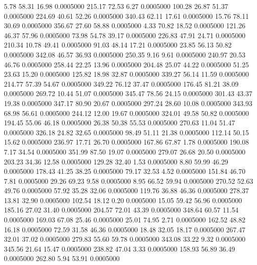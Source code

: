    5.78   58.31   16.98   0.0005000
 215.17   72.53    6.27   0.0005000
 100.28   26.87   51.37   0.0005000
 224.69   40.61   52.26   0.0005000
 340.43   62.11   17.61   0.0005000
  15.76   78.11   30.69   0.0005000
 356.67   27.60   58.88   0.0005000
   4.33   70.82   18.52   0.0005000
 121.26   46.37   57.96   0.0005000
  73.98   54.78   39.17   0.0005000
 226.83   47.91   24.71   0.0005000
 210.34   10.78   49.41   0.0005000
  91.03   48.14   17.21   0.0005000
  23.85   56.13   50.82   0.0005000
 342.08   46.57   36.93   0.0005000
 250.35    9.16    9.61   0.0005000
 240.97   20.53   46.76   0.0005000
 258.44   22.25   13.96   0.0005000
 204.48   25.07   44.22   0.0005000
  51.25   23.63   15.20   0.0005000
 125.82   18.98   32.87   0.0005000
 339.27   56.14   11.59   0.0005000
 214.77   57.39   54.67   0.0005000
 349.22   76.12   37.47   0.0005000
 176.45   81.21   38.09   0.0005000
 269.72   10.44   51.07   0.0005000
 345.47   78.56   24.15   0.0005000
 301.43   43.37   19.38   0.0005000
 347.17   80.90   20.67   0.0005000
 297.24   28.60   10.08   0.0005000
 343.93   68.98   56.61   0.0005000
 244.12   12.00   19.67   0.0005000
 324.01   49.58   50.82   0.0005000
 194.45   55.06   46.18   0.0005000
  26.38   50.38   55.53   0.0005000
 270.63   11.04   51.47   0.0005000
 326.18   24.82   32.65   0.0005000
  98.49   51.11   21.38   0.0005000
 112.14   50.15   15.62   0.0005000
 236.97   17.71   26.70   0.0005000
 167.86   67.87    1.78   0.0005000
 190.08    7.17   34.54   0.0005000
 351.99   87.50   19.07   0.0005000
 279.07   26.68   20.50   0.0005000
 203.23   34.36   12.58   0.0005000
 129.28   32.40    1.53   0.0005000
   8.80   59.99   46.29   0.0005000
 178.43   41.25   38.25   0.0005000
  79.17   32.53    4.52   0.0005000
 151.84   46.70    7.81   0.0005000
  29.26   69.23    9.58   0.0005000
   8.95   66.52   59.94   0.0005000
 270.52   52.63   49.76   0.0005000
  57.92   35.28   32.06   0.0005000
 119.76   36.88   46.36   0.0005000
 278.37   13.81   32.90   0.0005000
 102.54   18.12    0.20   0.0005000
  15.05   59.42   56.96   0.0005000
 185.16   27.02   31.40   0.0005000
 204.57   72.01   43.39   0.0005000
 348.64   60.57   11.54   0.0005000
 169.03   67.08   25.46   0.0005000
  25.01   74.95    2.71   0.0005000
 162.52   48.82   16.18   0.0005000
  72.59   31.58   46.36   0.0005000
  18.48   32.05   18.17   0.0005000
 267.47   32.01   37.02   0.0005000
 279.83   55.60   59.78   0.0005000
 343.08   33.22    9.32   0.0005000
 345.56   21.64   15.47   0.0005000
 238.82   47.04    3.33   0.0005000
 158.93   56.89   36.49   0.0005000
 262.80    5.94   53.91   0.0005000

